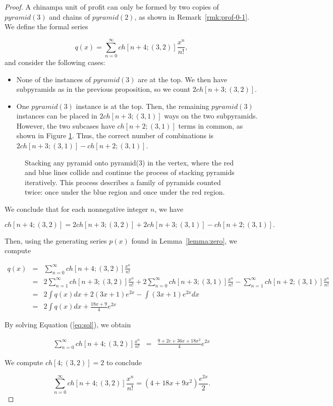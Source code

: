 \documentclass[10pt,a4paper]{amsart}
\newcommand{\apyr}[1][l]{\ensuremath{pyramid(#1)}}
\newcommand{\chin}[2][n]{\ensuremath{ch[#1;#2]}}
\begin{document}
\begin{proof} 
A chinampa unit of profit can only be formed by two copies of $\apyr[3]$ and chains of $\apyr[2]$, as shown in Remark~\ref{rmk:prof-0-1}. We define the formal series

 \[q(x) = \sum_{n=0}^{\infty} \chin[n+4]{(3,2)}\frac{x^n}{n!},\] 
and consider the following cases:

\begin{itemize}
\item None of the instances of $\apyr[3]$ are at the top. We then have subpyramids as in the previous proposition, so we count $2\chin[n+3]{(3,2)}.$ 
\item One $\apyr[3]$ instance is at the top. Then, the remaining $\apyr[3]$ instances can be placed in 
    $2\chin[n+3]{(3,1)}$ ways on the two subpyramids. However, the two subcases have $\chin[n+2]{(3,1)}$ terms in common, as shown in Figure \ref{fig:double}. Thus, the correct number of combinations is $2\chin[n+3]{ (3,1)}-\chin[n+2]{(3,1)}$.
\end{itemize}

\begin{figure}[H]

\caption{Stacking any pyramid onto pyramid(3) in the vertex, where the red and blue lines collide and continue the process of stacking pyramids iteratively. This process describes a family of pyramids counted twice: once under the blue region and once under the red region. }
\label{fig:double}
\end{figure}

We conclude that for each nonnegative integer $n$, we have

\[\chin[n+4]{(3,2)}=2\chin[n+3] {(3,2)}+2\chin[n+3]{ (3,1)}-\chin[n+2]{(3,1)}.\]

Then, using the generating series $p(x)$ found in Lemma~\ref{lemma:zero}, we compute

\begin{eqnarray*}
q(x)&=&
\sum_{n=0}^{\infty} \chin[n+4]{ (3,2)}\frac{x^n}{n!}\\
&=&2\sum_{n=1}^{\infty} \chin[n+3] {(3,2)}\frac{x^n}{n!}+2\sum_{n=0}^{\infty} \chin[n+3] {(3,1)}\frac{x^n}{n!}-\sum_{n=1}^{\infty} \chin[n+2]{(3,1)}\frac{x^n}{n!}\\
&=&2\int q(x)dx+2 (3x+1)e^{2x}- \int (3x+1)e^{2x}dx\\
&=&2\int q(x)dx+ \frac{18x+9}{4}e^{2x}
\end{eqnarray*}

By solving Equation (\ref{eq:sol}), we obtain

\begin{eqnarray*}
\sum_{n=0}^{\infty} \chin[n+4] {(3,2)}\frac{x^n}{n!}&=&\frac{9+2c+36x+18x^2}{4}e^{2x}
\end{eqnarray*}

We compute $\chin[4]{(3,2)}=2$ to conclude

\[\sum_{n=0}^{\infty} \chin[n+4] {(3,2)}\frac{x^n}{n!}=(4+18x+9x^2)\frac{e^{2x}}{2}.\]
\end{proof}
\end{document}
